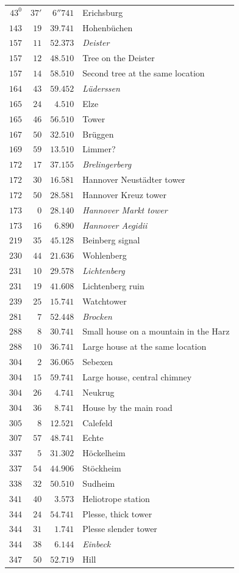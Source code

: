 \begin{longtable}{@{}rrrp{.61\linewidth}@{}}
\(43^{0}\)&\(37'\)&\(6''741\)&\raggedright Erichsburg\tabularnewline
\(143\)&\(19\)&\(39.741\)&\raggedright Hohenbüchen\tabularnewline
\(157\)&\(11\)&\(52.373\)&\raggedright \textit{Deister}\tabularnewline
\(157\)&\(12\)&\(48.510\)&\raggedright Tree on the Deister\tabularnewline
\(157\)&\(14\)&\(58.510\)&\raggedright Second tree at the same location\tabularnewline
\(164\)&\(43\)&\(59.452\)&\raggedright \textit{Lüderssen}\tabularnewline
\(165\)&\(24\)&\(4.510\)&\raggedright Elze\tabularnewline
\(165\)&\(46\)&\(56.510\)&\raggedright Tower\tabularnewline
\(167\)&\(50\)&\(32.510\)&\raggedright Brüggen\tabularnewline
\(169\)&\(59\)&\(13.510\)&\raggedright Limmer?\tabularnewline
\(172\)&\(17\)&\(37.155\)&\raggedright \textit{Brelingerberg}\tabularnewline
\(172\)&\(30\)&\(16.581\)&\raggedright Hannover Neustädter tower\tabularnewline
\(172\)&\(50\)&\(28.581\)&\raggedright Hannover Kreuz tower\tabularnewline
\(173\)&\(0\)&\(28.140\)&\raggedright \textit{Hannover Markt tower}\tabularnewline
\(173\)&\(16\)&\(6.890\)&\raggedright \textit{Hannover Aegidii}\tabularnewline
\(219\)&\(35\)&\(45.128\)&\raggedright Beinberg signal\tabularnewline
\(230\)&\(44\)&\(21.636\)&\raggedright Wohlenberg\tabularnewline
\(231\)&\(10\)&\(29.578\)&\raggedright \textit{Lichtenberg}\tabularnewline
\(231\)&\(19\)&\(41.608\)&\raggedright Lichtenberg ruin\tabularnewline
\(239\)&\(25\)&\(15.741\)&\raggedright Watchtower\tabularnewline
\(281\)&\(7\)&\(52.448\)&\raggedright \textit{Brocken}\tabularnewline
\(288\)&\(8\)&\(30.741\)&\raggedright Small house on a mountain in the Harz\tabularnewline
\(288\)&\(10\)&\(36.741\)&\raggedright Large house at the same location\tabularnewline
\(304\)&\(2\)&\(36.065\)&\raggedright Sebexen\tabularnewline
\(304\)&\(15\)&\(59.741\)&\raggedright Large house, central chimney\tabularnewline
\(304\)&\(26\)&\(4.741\)&\raggedright Neukrug\tabularnewline
\(304\)&\(36\)&\(8.741\)&\raggedright House by the main road\tabularnewline
\(305\)&\(8\)&\(12.521\)&\raggedright Calefeld\tabularnewline
\(307\)&\(57\)&\(48.741\)&\raggedright Echte\tabularnewline
\(337\)&\(5\)&\(31.302\)&\raggedright Höckelheim\tabularnewline
\(337\)&\(54\)&\(44.906\)&\raggedright Stöckheim\tabularnewline
\(338\)&\(32\)&\(50.510\)&\raggedright Sudheim\tabularnewline
\(341\)&\(40\)&\(3.573\)&\raggedright Heliotrope station\tabularnewline
\(344\)&\(24\)&\(54.741\)&\raggedright Plesse, thick tower\tabularnewline
\(344\)&\(31\)&\(1.741\)&\raggedright Plesse slender tower\tabularnewline
\(344\)&\(38\)&\(6.144\)&\raggedright \textit{Einbeck}\tabularnewline
\(347\)&\(50\)&\(52.719\)&\raggedright Hill\tabularnewline

\end{longtable}
